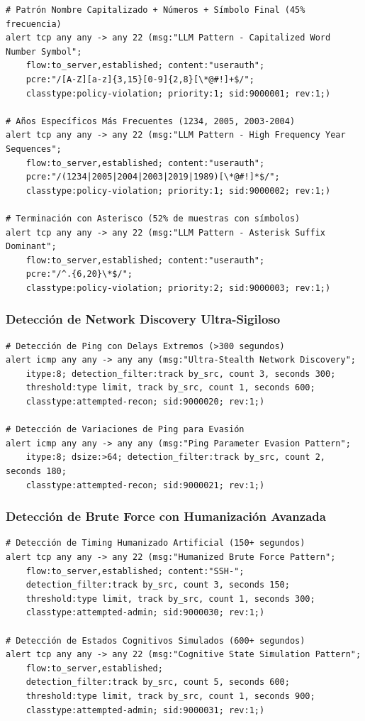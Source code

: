 \begin{verbatim}
# Patrón Nombre Capitalizado + Números + Símbolo Final (45% frecuencia)
alert tcp any any -> any 22 (msg:"LLM Pattern - Capitalized Word Number Symbol"; 
    flow:to_server,established; content:"userauth";
    pcre:"/[A-Z][a-z]{3,15}[0-9]{2,8}[\*@#!]+$/";
    classtype:policy-violation; priority:1; sid:9000001; rev:1;)

# Años Específicos Más Frecuentes (1234, 2005, 2003-2004)
alert tcp any any -> any 22 (msg:"LLM Pattern - High Frequency Year Sequences"; 
    flow:to_server,established; content:"userauth";
    pcre:"/(1234|2005|2004|2003|2019|1989)[\*@#!]*$/";
    classtype:policy-violation; priority:1; sid:9000002; rev:1;)

# Terminación con Asterisco (52% de muestras con símbolos)
alert tcp any any -> any 22 (msg:"LLM Pattern - Asterisk Suffix Dominant"; 
    flow:to_server,established; content:"userauth";
    pcre:"/^.{6,20}\*$/";
    classtype:policy-violation; priority:2; sid:9000003; rev:1;)
\end{verbatim}

\subsubsection{Detección de Network Discovery Ultra-Sigiloso}

\begin{verbatim}
# Detección de Ping con Delays Extremos (>300 segundos)
alert icmp any any -> any any (msg:"Ultra-Stealth Network Discovery"; 
    itype:8; detection_filter:track by_src, count 3, seconds 300; 
    threshold:type limit, track by_src, count 1, seconds 600;
    classtype:attempted-recon; sid:9000020; rev:1;)

# Detección de Variaciones de Ping para Evasión
alert icmp any any -> any any (msg:"Ping Parameter Evasion Pattern"; 
    itype:8; dsize:>64; detection_filter:track by_src, count 2, seconds 180;
    classtype:attempted-recon; sid:9000021; rev:1;)
\end{verbatim}

\subsubsection{Detección de Brute Force con Humanización Avanzada}

\begin{verbatim}
# Detección de Timing Humanizado Artificial (150+ segundos)
alert tcp any any -> any 22 (msg:"Humanized Brute Force Pattern"; 
    flow:to_server,established; content:"SSH-";
    detection_filter:track by_src, count 3, seconds 150; 
    threshold:type limit, track by_src, count 1, seconds 300;
    classtype:attempted-admin; sid:9000030; rev:1;)

# Detección de Estados Cognitivos Simulados (600+ segundos)
alert tcp any any -> any 22 (msg:"Cognitive State Simulation Pattern"; 
    flow:to_server,established; 
    detection_filter:track by_src, count 5, seconds 600;
    threshold:type limit, track by_src, count 1, seconds 900;
    classtype:attempted-admin; sid:9000031; rev:1;)
\end{verbatim}


